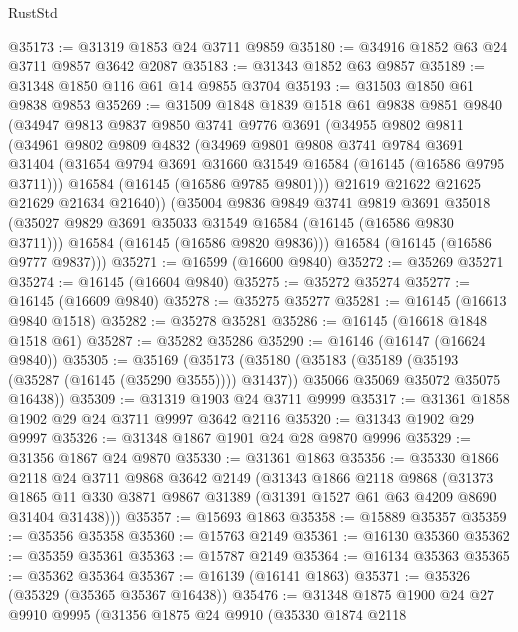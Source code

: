 \begin{lexlean}{RustStd}
\begin{coremodule}
@35173 := @31319 @1853 @24 @3711 @9859
@35180 := @34916 @1852 @63 @24 @3711 @9857 @3642 @2087
@35183 := @31343 @1852 @63 @9857
@35189 := @31348 @1850 @116 @61 @14 @9855 @3704
@35193 := @31503 @1850 @61 @9838 @9853
@35269 := @31509
    @1848
    @1839
    @1518
    @61
    @9838
    @9851
    @9840
    (@34947
      @9813
      @9837
      @9850
      @3741
      @9776
      @3691
      (@34955
        @9802
        @9811
        (@34961
          @9802
          @9809
          @4832
          (@34969
            @9801
            @9808
            @3741
            @9784
            @3691
            @31404
            (@31654 @9794 @3691 @31660 @31549 @16584 (@16145 (@16586 @9795 @3711)))
            @16584
            (@16145 (@16586 @9785 @9801)))
          @21619
          @21622
          @21625
          @21629
          @21634
          @21640))
      (@35004
        @9836
        @9849
        @3741
        @9819
        @3691
        @35018
        (@35027 @9829 @3691 @35033 @31549 @16584 (@16145 (@16586 @9830 @3711)))
        @16584
        (@16145 (@16586 @9820 @9836)))
      @16584
      (@16145 (@16586 @9777 @9837)))
@35271 := @16599 (@16600 @9840)
@35272 := @35269 @35271
@35274 := @16145 (@16604 @9840)
@35275 := @35272 @35274
@35277 := @16145 (@16609 @9840)
@35278 := @35275 @35277
@35281 := @16145 (@16613 @9840 @1518)
@35282 := @35278 @35281
@35286 := @16145 (@16618 @1848 @1518 @61)
@35287 := @35282 @35286
@35290 := @16146 (@16147 (@16624 @9840))
@35305 := @35169
    (@35173
      (@35180
        (@35183 (@35189 (@35193 (@35287 (@16145 (@35290 @3555)))) @31437))
        @35066
        @35069
        @35072
        @35075
        @16438))
@35309 := @31319 @1903 @24 @3711 @9999
@35317 := @31361 @1858 @1902 @29 @24 @3711 @9997 @3642 @2116
@35320 := @31343 @1902 @29 @9997
@35326 := @31348 @1867 @1901 @24 @28 @9870 @9996
@35329 := @31356 @1867 @24 @9870
@35330 := @31361 @1863
@35356 := @35330
    @1866
    @2118
    @24
    @3711
    @9868
    @3642
    @2149
    (@31343
      @1866
      @2118
      @9868
      (@31373 @1865 @11 @330 @3871 @9867 @31389 (@31391 @1527 @61 @63 @4209 @8690 @31404 @31438)))
@35357 := @15693 @1863
@35358 := @15889 @35357
@35359 := @35356 @35358
@35360 := @15763 @2149
@35361 := @16130 @35360
@35362 := @35359 @35361
@35363 := @15787 @2149
@35364 := @16134 @35363
@35365 := @35362 @35364
@35367 := @16139 (@16141 @1863)
@35371 := @35326 (@35329 (@35365 @35367 @16438))
@35476 := @31348
    @1875
    @1900
    @24
    @27
    @9910
    @9995
    (@31356
      @1875
      @24
      @9910
      (@35330
        @1874
        @2118

\end{coremodule}
\end{lexlean}
